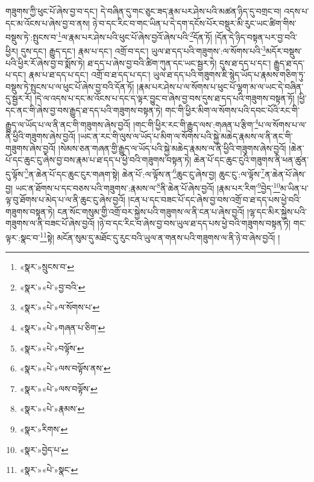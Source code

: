 གཟུགས་ཀྱི་ཕུང་པོ་ཞེས་བྱ་བ་དང་། དེ་བཞིན་དུ་གང་ཅུང་ཟད་རྣམ་པར་ཤེས་པའི་མཚན་ཉིད་དུ་བགྲང་བ། འདས་པ་དང་མ་འོངས་པ་ཞེས་བྱ་བ་ནས། ཉེ་བ་དང་རིང་བ་གང་ཡིན་པ་དེ་དག་དངོས་པོར་བསྡུར་མི་རུང་ཡང་ཚིག་གིས་བསྡུས་ཏེ་:སྤུངས་བ་\footnote{«སྣར་»སྲུངས་བ་}ལ་རྣམ་པར་ཤེས་པའི་ཕུང་པོ་ཞེས་བྱའོ་ཞེས་པའི་\footnote{«སྣར་»«པེ་»བྱ་བའི་}དོན་ཏོ། །དོན་དེ་ཉིད་བསྟན་པར་བྱ་བའི་ཕྱིར། དུས་དང་། རྒྱུད་དང་། རྣམ་པ་དང་། འགྲོ་བ་དང་། ཡུལ་ཐ་དད་པའི་གཟུགས་:ལ་སོགས་པའི་\footnote{«སྣར་»«པེ་»ལ་སོགས་པ་}མདོར་བསྡུས་པའི་ཕྱིར་རོ་ཞེས་བྱ་བ་སྨོས་ཏེ། ཐ་དད་པ་ཞེས་བྱ་བའི་ཚིག་ཀུན་དང་ཡང་སྦྱར་ཏེ། དུས་ཐ་དད་པ་དང་། རྒྱུད་ཐ་དད་པ་དང་། རྣམ་པ་ཐ་དད་པ་དང་། འགྲོ་བ་ཐ་དད་པ་དང་། ཡུལ་ཐ་དད་པའི་གཟུགས་ཇི་སྙེད་ཡོད་པ་རྣམས་གཅིག་ཏུ་བསྡུས་ཏེ་སྤུངས་པ་ལ་ཕུང་པོ་ཞེས་བྱ་བའི་དོན་ཏོ། །རྣམ་པར་ཤེས་པ་ལ་སོགས་པ་ཕུང་པོ་ལྷག་མ་ལ་ཡང་དེ་བཞིན་དུ་སྦྱར་རོ། །དེ་ལ་འདས་པ་དང་མ་འོངས་པ་དང་ད་ལྟར་བྱུང་བ་ཞེས་བྱ་བས་དུས་ཐ་དད་པའི་གཟུགས་བསྟན་ཏོ། །ཕྱི་དང་ནང་གི་ཞེས་བྱ་བས་རྒྱུད་ཐ་དད་པའི་གཟུགས་བསྟན་ཏེ། གང་གི་ཕྱིར་མིག་ལ་སོགས་པའི་དབང་པོའི་རང་གི་རྒྱུད་ལ་ཡོད་པ་ལ་ནི་ནང་གི་གཟུགས་ཞེས་བྱའོ། །གང་གི་ཕྱིར་རང་གི་རྒྱུད་ལས་:གཞན་པ་རྩིག་\footnote{«སྣར་»«པེ་»གཞན་པ་ཅིག་}པ་ལ་སོགས་པ་ལ་ནི་ཕྱིའི་གཟུགས་ཞེས་བྱའོ། །ཡང་ན་རང་གི་ལུས་ལ་ཡོད་པ་མིག་ལ་སོགས་པའི་སྐྱེ་མཆེད་རྣམས་ལ་ནི་ནང་གི་གཟུགས་ཞེས་བྱའོ། །སེམས་ཅན་གཞན་གྱི་རྒྱུད་ལ་ཡོད་པའི་སྐྱེ་མཆེད་རྣམས་ལ་ནི་ཕྱིའི་གཟུགས་ཞེས་བྱའོ། །ཆེན་པོ་དང་ཆུང་ངུ་ཞེས་བྱ་བས་རྣམ་པ་ཐ་དད་པ་ཕྱེ་བའི་གཟུགས་བསྟན་ཏེ། ཆེན་པོ་དང་ཆུང་ངུའི་གཟུགས་ནི་ཕན་ཚུན་དུ་ལྟོས་\footnote{«སྣར་»«པེ་»བལྟོས་}ན་ཆེན་པོ་དང་ཆུང་ངུར་གཞག་སྟེ། ཆེན་པོ་:ལ་ལྟོས་ན་\footnote{«སྣར་»«པེ་»ལས་བལྟོས་ནས་}ཆུང་ངུ་ཞེས་བྱ། ཆུང་ངུ་:ལ་ལྟོས་\footnote{«སྣར་»«པེ་»ལས་བལྟོས་}ན་ཆེན་པོ་ཞེས་བྱ། ཡང་ན་ཐོགས་པ་དང་བཅས་པའི་གཟུགས་:རྣམས་ལ་\footnote{«སྣར་»«པེ་»རྣམས་}ནི་ཆེན་པོ་ཞེས་བྱའོ། །རྣམ་པར་རིག་\footnote{«སྣར་»རིགས་}བྱེད་\footnote{«སྣར་»བྱེད་པ་}མ་ཡིན་པ་ལྟ་བུ་ཐོགས་པ་མེད་པ་ལ་ནི་ཆུང་ངུ་ཞེས་བྱའོ། །ངན་པ་དང་བཟང་པོ་དང་ཞེས་བྱ་བས་འགྲོ་བ་ཐ་དད་པས་ཕྱེ་བའི་གཟུགས་བསྟན་ཏེ། ངན་སོང་གསུམ་གྱི་འགྲོ་བར་སྐྱེས་པའི་གཟུགས་ལ་ནི་ངན་པ་ཞེས་བྱའོ། །ལྷ་དང་མིར་སྐྱེས་པའི་གཟུགས་ལ་ནི་བཟང་པོ་ཞེས་བྱའོ། །ཉེ་བ་དང་རིང་བ་ཞེས་བྱ་བས་ཡུལ་ཐ་དད་པས་ཕྱེ་བའི་གཟུགས་བསྟན་ཏེ། གང་ལྟར་:སྣང་བ་\footnote{«སྣར་»«པེ་»སྣང་}སྟེ། མངོན་སུམ་དུ་མཐོང་དུ་རུང་བའི་ཡུལ་ན་གནས་པའི་གཟུགས་ལ་ནི་ཉེ་བ་ཞེས་བྱའོ། །
